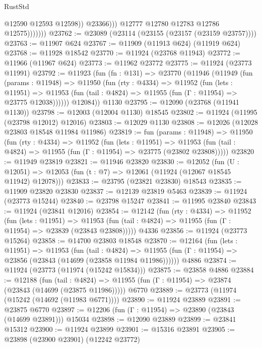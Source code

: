 \begin{lexlean}{RustStd}
\begin{coremodule}
{\begin{coremodule}
{{{{{{{{{{{{{{{{{{{{{{{{{{{{{{{{{{{{{{{{{{{{{{{{{{{{{{{{{{{{{{{{{{{{{{{{{{{{{{{{                            @12590
                            @12593
                            @12598))
                        @23366)))
                  @12777
                  @12780
                  @12783
                  @12786
                  @12575)))))))
@23762 := @23089 (@23114 (@23155 (@23157 (@23159 @23757))))
@23763 := @11907 @624
@23767 := @11909 (@11913 @624) (@11919 @624)
@23768 := @11928 @18542
@23770 := @11924 (@23768 @11943)
@23772 := @11966 (@11967 @624)
@23773 := @11962 @23772
@23775 := @11924 (@23773 @11991)
@23792 := @11923
    (fun (fn : @131) =>
    @23770
      (@11946
        (@11949
          (fun (params : @11948) =>
          @11950
            (fun (rty : @4334) =>
            @11952
              (fun (lets : @11951) =>
              @11953 (fun (tail : @4824) => @11955 (fun (Γ : @11954) => @23775 @12038))))))
        @12084))
    @1130
@23795 := @12090 (@23768 (@11941 @1130))
@23798 := @12003 (@12004 @1130) @18545
@23802 := @11924 (@11995 (@23798 @12012) @12016)
@23803 := @12029 @1130
@23808 := @12026 (@12028 @23803 @18548 @11984 @11986)
@23819 := fun (params : @11948) =>
  @11950
    (fun (rty : @4334) =>
    @11952
      (fun (lets : @11951) =>
      @11953 (fun (tail : @4824) => @11955 (fun (Γ : @11954) => @23775 (@23802 @23808)))))
@23820 := @11949 @23819
@23821 := @11946 @23820
@23830 := @12052
    (fun (U : @12051) => @12053 (fun (t : @7) => @12061 (@11924 (@12067 @18545 @11942) @12078)))
@23833 := @23795 (@23821 @23830) @18543
@23835 := @11909 @23820 @23830
@23837 := @12139 @23819 @5463
@23839 := @11924 (@23773 @15244)
@23840 := @23798 @15247
@23841 := @11995 @23840
@23843 := @11924 (@23841 @12016)
@23854 := @12142
    (fun (rty : @4334) =>
    @11952
      (fun (lets : @11951) =>
      @11953 (fun (tail : @4824) => @11955 (fun (Γ : @11954) => @23839 (@23843 @23808)))))
    @4336
@23856 := @11924 (@23773 @15264)
@23858 := @14700 @23803 @18548
@23870 := @12164
    (fun (lets : @11951) =>
    @11953
      (fun (tail : @4824) =>
      @11955 (fun (Γ : @11954) => @23856 (@23843 (@14699 (@23858 @11984 @11986))))))
    @4886
@23874 := @11924 (@23773 (@11974 (@15242 @15834)))
@23875 := @23858 @4886
@23884 := @12188
    (fun (tail : @4824) => @11955 (fun (Γ : @11954) => @23874 (@23843 (@14699 (@23875 @11986)))))
    @6770
@23889 := @23773 (@11974 (@15242 (@14692 (@11983 @6771))))
@23890 := @11924 @23889
@23891 := @23875 @6770
@23897 := @12206 (fun (Γ : @11954) => @23890 (@23843 (@14699 @23891))) @15034
@23898 := @12090 @23889
@23899 := @23841 @15312
@23900 := @11924 @23899
@23901 := @15316 @23891
@23905 := @23898 (@23900 @23901) (@12242 @23772)
}}}}}}}}}}}}}}}}}}}}}}}}}}}}}}}}}}}}}}}}}}}}}}}}}}}}}}}}}}}}}}}}}}}}}}}}}}}}}}}}
\end{coremodule}}
\end{coremodule}
\end{lexlean}
